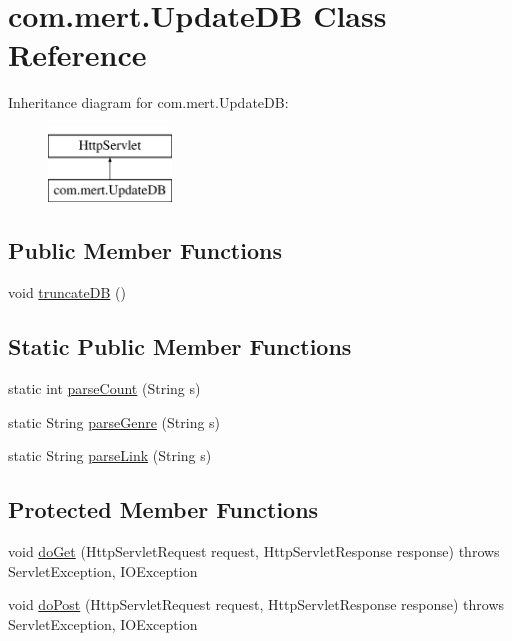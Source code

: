 \hypertarget{classcom_1_1mert_1_1_update_d_b}{}\section{com.\+mert.\+Update\+DB Class Reference}
\label{classcom_1_1mert_1_1_update_d_b}
Inheritance diagram for com.\+mert.\+Update\+DB\+:\begin{figure}[H]
\begin{center}
\leavevmode
\includegraphics[height=2.000000cm]{classcom_1_1mert_1_1_update_d_b}
\end{center}
\end{figure}
\subsection*{Public Member Functions}
\begin{DoxyCompactItemize}
\item 
void \hyperlink{classcom_1_1mert_1_1_update_d_b_ac0ad352f8b973b5d27acd72ad42f9028}{truncate\+DB} ()
\end{DoxyCompactItemize}
\subsection*{Static Public Member Functions}
\begin{DoxyCompactItemize}
\item 
static int \hyperlink{classcom_1_1mert_1_1_update_d_b_a56821bedc78cacd17e6546e05b8d5fe2}{parse\+Count} (String s)
\item 
static String \hyperlink{classcom_1_1mert_1_1_update_d_b_a318392aaae286a267a142550bdd78ca0}{parse\+Genre} (String s)
\item 
static String \hyperlink{classcom_1_1mert_1_1_update_d_b_afc7e9c778e91d1cc8125fab56260efcb}{parse\+Link} (String s)
\end{DoxyCompactItemize}
\subsection*{Protected Member Functions}
\begin{DoxyCompactItemize}
\item 
void \hyperlink{classcom_1_1mert_1_1_update_d_b_abd05581f8da7d00b5d3cb2326f592dab}{do\+Get} (Http\+Servlet\+Request request, Http\+Servlet\+Response response)  throws Servlet\+Exception, I\+O\+Exception 
\item 
void \hyperlink{classcom_1_1mert_1_1_update_d_b_a8c87bdcc44be032b163f3d996d230585}{do\+Post} (Http\+Servlet\+Request request, Http\+Servlet\+Response response)  throws Servlet\+Exception, I\+O\+Exception 
\end{DoxyCompactItemize}


